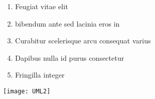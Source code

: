 \documentclass[landscape,a0paper,fontscale=0.285]{baposter} %
\newcommand{\compresslist}{ %
\setlength{\itemsep}{1pt}
\setlength{\parskip}{0pt}
\setlength{\parsep}{0pt}
}
\begin{document}
\begin{poster}
{\begin{enumerate}\compresslist
\item Feugiat vitae elit
\item bibendum ante sed lacinia eros in
\item Curabitur scelerisque arcu consequat varius
\item Dapibus nulla id purus consectetur
\item Fringilla integer 
\end{enumerate}

\vspace{0.3em} %
}







{

\begin{multicols}{2}
\begin{center}
\texttt{[image: UML2]}
\end{center}

\end{multicols}

}
\end{poster}
\end{document}
